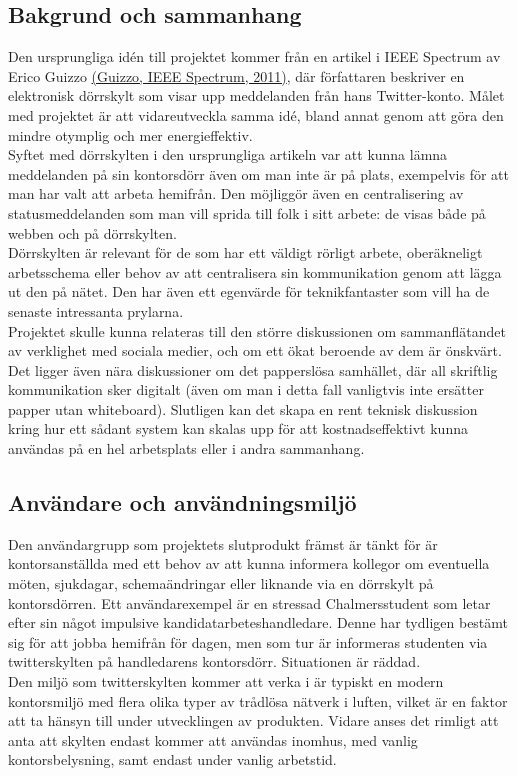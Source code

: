 \documentclass[a4paper,11pt]{article}
\begin{document}
\subsection{Bakgrund och sammanhang}
Den ursprungliga idén till projektet kommer från en artikel i IEEE Spectrum av Erico Guizzo \hyperref[spectrum]{(Guizzo, IEEE Spectrum, 2011)}, där författaren beskriver en elektronisk dörrskylt som visar upp meddelanden från hans Twitter-konto. Målet med projektet är att vidareutveckla samma idé, bland annat genom att göra den mindre otymplig och mer energieffektiv. \\

Syftet med dörrskylten i den ursprungliga artikeln var att kunna lämna meddelanden på sin kontorsdörr även om man inte är på plats, exempelvis för att man har valt att arbeta hemifrån. Den möjliggör även en centralisering av statusmeddelanden som man vill sprida till folk i sitt arbete: de visas både på webben och på dörrskylten. \\

Dörrskylten är relevant för de som har ett väldigt rörligt arbete, oberäkneligt arbetsschema eller behov av att centralisera sin kommunikation genom att lägga ut den på nätet. Den har även ett egenvärde för teknikfantaster som vill ha de senaste intressanta prylarna. \\

Projektet skulle kunna relateras till den större diskussionen om sammanflätandet av verklighet med sociala medier, och om ett ökat beroende av dem är önskvärt. Det ligger även nära diskussioner om det papperslösa samhället, där all skriftlig kommunikation sker digitalt (även om man i detta fall vanligtvis inte ersätter papper utan whiteboard). Slutligen kan det skapa en rent teknisk diskussion kring hur ett sådant system kan skalas upp för att kostnadseffektivt kunna användas på en hel arbetsplats eller i andra sammanhang.

\subsection{Användare och användningsmiljö}
Den användargrupp som projektets slutprodukt främst är tänkt för är kontorsanställda med ett behov av att kunna informera kollegor om eventuella möten, sjukdagar, schemaändringar eller liknande via en dörrskylt på kontorsdörren. Ett användarexempel är en stressad Chalmersstudent som letar efter sin något impulsive kandidatarbeteshandledare. Denne har tydligen bestämt sig för att jobba hemifrån för dagen, men som tur är informeras studenten via twitterskylten på handledarens kontorsdörr. Situationen är räddad. \\
Den miljö som twitterskylten kommer att verka i är typiskt en modern kontorsmiljö med flera olika typer av trådlösa nätverk i luften, vilket är en faktor att ta hänsyn till under utvecklingen av produkten. Vidare anses det rimligt att anta att skylten endast kommer att användas inomhus, med vanlig kontorsbelysning, samt endast under vanlig arbetstid.
\end{document}
